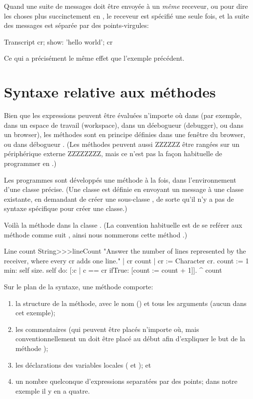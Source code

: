 \documentclass[a4paper,10pt,twoside]{book}
\begin{document}
Quand une suite de messages doit \^{e}tre envoy\'{e}e \`{a} un \emph{m\^{e}me} receveur, 
ou pour dire les choses plus succinctement en , le receveur est sp\'{e}cifi\'{e} une seule fois, et la suite des messages est s\'{e}par\'{e}e par des points-virgules:

\begin{code}{}
Transcript cr;
    show: 'hello world';
    cr
\end{code}
Ce qui a pr\'{e}cis\'{e}ment le m\^{e}me effet que l'exemple pr\'{e}c\'{e}dent.


\section{Syntaxe relative aux m\'{e}thodes}
Bien que les expressions peuvent \^{e}tre \'{e}valu\'{e}es n'importe o\`{u} dans \sq (par exemple, dans un espace de travail (workspace), dans un d\'{e}ebogueur (debugger), ou dans un browser), les m\'{e}thodes sont en principe d\'{e}finies dans une fen\^{e}tre du browser, ou dans d\'{e}bogueur .
(Les m\'{e}thodes peuvent aussi ZZZZZZ \^{e}tre rang\'{e}es sur un p\'{e}riph\'{e}rique externe ZZZZZZZZ, mais ce n'est pas la fa\c{c}on habituelle de programmer en \sq.)

Les programmes sont d\'{e}velopp\'{e}s une m\'{e}thode \`{a} la fois, dans l'environnement d'une classe pr\'{e}cise.
(Une classe est d\'{e}finie en envoyant un message \`{a} une classe existante, en demandant de cr\'{e}er une sous-classe , de sorte qu'il n'y a pas de syntaxe sp\'{e}cifique pour cr\'{e}er une classe.)

Voil\`{a} la m\'{e}thode  dans la classe  .
(La convention habituelle est de se ref\'{e}rer aux m\'{e}thode comme suit , ainsi nous nommerons cette m\'{e}thod .)

\begin{method}[lineCount]{Line count}
String>>>lineCount
   "Answer the number of lines represented by the receiver,
   where every cr adds one line."
   | cr count |
   cr := Character cr.
   count := 1  min: self size.
   self do:
      [:c | c == cr ifTrue: [count := count + 1]].
   ^ count
\end{method}

Sur le plan de la syntaxe, une m\'{e}thode comporte:
\begin{enumerate}
  \item la structure de la m\'{e}thode, avec le nom (\ie {}) et tous les arguments (aucun dans cet exemple);
  \item les commentaires (qui peuvent \^{e}tre plac\'{e}s n'importe o\`{u}, mais conventionnellement un doit \^{e}tre plac\'{e} au d\'{e}but afin d'expliquer le but de la m\'{e}thode );
  \item les d\'{e}clarations des variables locales (\ie {} et ); et
  \item un nombre quelconque d'expressions separat\'{e}es par des points; dans notre exemple il y en a quatre.
\end{enumerate}
\end{document}

